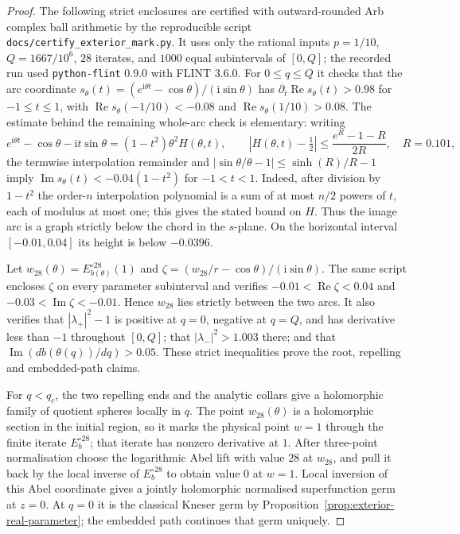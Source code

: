 \documentclass[11pt]{amsart}
\theoremstyle{definition}
\newcommand{\ii}{\mathrm{i}}
\begin{document}
\begin{proof}
The following strict enclosures are certified with outward-rounded
Arb complex ball arithmetic by the reproducible script
\texttt{docs/certify\_exterior\_mark.py}.  It uses only the rational
inputs $p=1/10$, $Q=1667/10^6$, $28$ iterates, and $1000$ equal
subintervals of $[0,Q]$; the recorded run used
\texttt{python-flint} 0.9.0 with FLINT 3.6.0.  For $0\le q\le Q$ it checks that the arc
coordinate
$s_\theta(t)=(e^{\ii\theta t}-\cos\theta)/(\ii\sin\theta)$
has $\partial_t\operatorname{Re}s_\theta(t)>0.98$ for $-1\le t\le1$,
with $\operatorname{Re}s_\theta(-1/10)<-0.08$ and
$\operatorname{Re}s_\theta(1/10)>0.08$.
The estimate behind the remaining whole-arc check is elementary:
writing
\[
 e^{\ii\theta t}-\cos\theta-\ii t\sin\theta
 =(1-t^2)\theta^2H(\theta,t),
 \qquad
 |H(\theta,t)-\tfrac12|
 \le\frac{e^R-1-R}{2R},\quad R=0.101,
\]
the termwise interpolation remainder and
$|\sin\theta/\theta-1|\le\sinh(R)/R-1$ imply
$\operatorname{Im}s_\theta(t)<-0.04(1-t^2)$ for $-1<t<1$.
Indeed, after division by $1-t^2$ the order-$n$ interpolation
polynomial is a sum of at most $n/2$ powers of $t$, each of modulus
at most one; this gives the stated bound on $H$.
Thus the image arc is a graph strictly below the chord in the
$s$-plane.  On the horizontal interval $[-0.01,0.04]$ its height is
below $-0.0396$.

Let $w_{28}(\theta)=E_{b(\theta)}^{\circ28}(1)$ and
$\zeta=(w_{28}/r-\cos\theta)/(\ii\sin\theta)$.
The same script encloses $\zeta$ on every parameter subinterval and
verifies $-0.01<\operatorname{Re}\zeta<0.04$ and
$-0.03<\operatorname{Im}\zeta<-0.01$.  Hence $w_{28}$ lies strictly
between the two arcs.  It also verifies that
$|\lambda_+|^2-1$ is positive at $q=0$, negative at $q=Q$, and has
derivative less than $-1$ throughout $[0,Q]$; that
$|\lambda_-|^2>1.003$ there; and that
$\operatorname{Im}(d b(\theta(q))/dq)>0.05$.
These strict inequalities prove the root, repelling and embedded-path
claims.

For $q<q_c$, the two repelling ends and the analytic collars give a
holomorphic family of quotient spheres locally in $q$.
The point $w_{28}(\theta)$ is a holomorphic section in the initial
region, so it marks the physical point $w=1$ through the finite
iterate $E_b^{\circ28}$; that iterate has nonzero derivative at $1$.
After three-point normalisation choose the logarithmic Abel lift with
value $28$ at $w_{28}$, and pull it back by the local inverse of
$E_b^{\circ28}$ to obtain value $0$ at $w=1$.  Local inversion of
this Abel coordinate gives a jointly holomorphic normalised
superfunction germ at $z=0$.
At $q=0$ it is the classical Kneser germ by
Proposition~\ref{prop:exterior-real-parameter}; the embedded path
continues that germ uniquely.
\end{proof}
\end{document}
